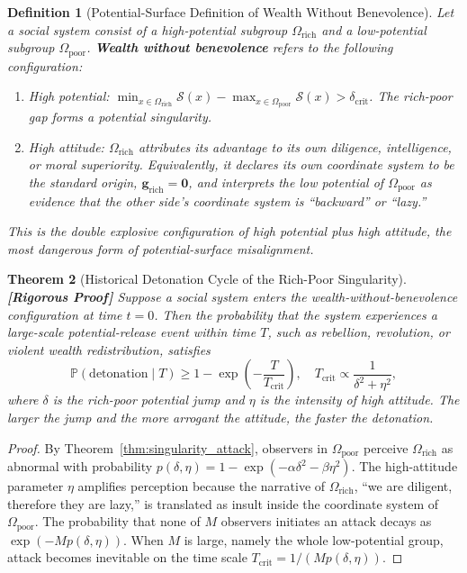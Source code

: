 \documentclass[12pt,a4paper]{article}
\newtheorem{theorem}{Theorem}[section]
\newtheorem{definition}[theorem]{Definition}
\theoremstyle{remark}
\newcommand{\Pbb}{\mathbb{P}}
\newcommand{\rigorFull}{\textnormal{\textbf{[Rigorous Proof]}}}
\begin{document}
\begin{definition}[Potential-Surface Definition of Wealth Without Benevolence]\label{def:wealth_cruelty}
Let a social system consist of a high-potential subgroup $\Omega_{\text{rich}}$ and a low-potential subgroup $\Omega_{\text{poor}}$. \textbf{Wealth without benevolence} refers to the following configuration:
\begin{enumerate}[label=(\roman*)]
    \item High potential: $\min_{x \in \Omega_{\text{rich}}} \mathcal{S}(x) - \max_{x \in \Omega_{\text{poor}}} \mathcal{S}(x) > \delta_{\text{crit}}$. The rich-poor gap forms a potential singularity.
    \item High attitude: $\Omega_{\text{rich}}$ attributes its advantage to its own diligence, intelligence, or moral superiority. Equivalently, it declares its own coordinate system to be the standard origin, $\mathbf{g}_{\text{rich}} = \mathbf{0}$, and interprets the low potential of $\Omega_{\text{poor}}$ as evidence that the other side's coordinate system is ``backward'' or ``lazy.''
\end{enumerate}
This is the double explosive configuration of high potential plus high attitude, the most dangerous form of potential-surface misalignment.
\end{definition}

\begin{theorem}[Historical Detonation Cycle of the Rich-Poor Singularity]\label{thm:historical_inevitable}\rigorFull
Suppose a social system enters the wealth-without-benevolence configuration at time $t=0$. Then the probability that the system experiences a large-scale potential-release event within time $T$, such as rebellion, revolution, or violent wealth redistribution, satisfies
\begin{equation}
    \Pbb(\text{detonation} \mid T) \geq 1 - \exp\left(-\frac{T}{T_{\text{crit}}}\right), \quad T_{\text{crit}} \propto \frac{1}{\delta^2 + \eta^2},
\end{equation}
where $\delta$ is the rich-poor potential jump and $\eta$ is the intensity of high attitude. The larger the jump and the more arrogant the attitude, the faster the detonation.
\end{theorem}

\begin{proof}
By Theorem~\ref{thm:singularity_attack}, observers in $\Omega_{\text{poor}}$ perceive $\Omega_{\text{rich}}$ as abnormal with probability $p(\delta, \eta) = 1 - \exp(-\alpha\delta^2 - \beta\eta^2)$. The high-attitude parameter $\eta$ amplifies perception because the narrative of $\Omega_{\text{rich}}$, ``we are diligent, therefore they are lazy,'' is translated as insult inside the coordinate system of $\Omega_{\text{poor}}$. The probability that none of $M$ observers initiates an attack decays as $\exp(-M p(\delta, \eta))$. When $M$ is large, namely the whole low-potential group, attack becomes inevitable on the time scale $T_{\text{crit}} = 1/(M p(\delta, \eta))$.
\end{proof}
\end{document}
